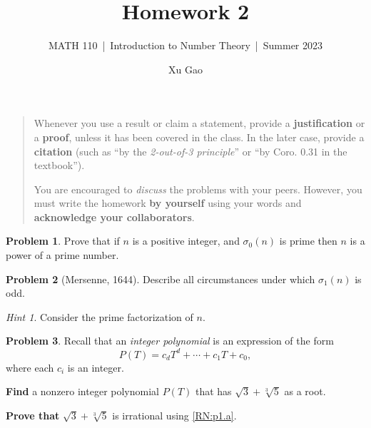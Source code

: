 \documentclass[11pt]{article}
\title{Homework 2}
\author{Xu Gao}
\subtitle{MATH 110~|~Introduction to Number Theory~|~Summer 2023}
\date{}
\theoremstyle{plain}
\theoremstyle{definition}
\newtheorem{problem}{Problem}
\theoremstyle{remark}
\newtheorem*{hint}{Hint}
\numberwithin{equation}{problem}
\begin{document}
\maketitle

\begin{quotation}
	Whenever you use a result or claim a statement, provide a \textbf{justification} or a \textbf{proof}, unless it has been covered in the class. In the later case, provide a \textbf{citation} (such as ``by the \emph{2-out-of-3 principle}'' or ``by Coro. 0.31 in the textbook'').

	You are encouraged to \emph{discuss} the problems with your peers. However, you must write the homework \textbf{by yourself} using your words and \textbf{acknowledge your collaborators}.
\end{quotation}
\vspace*{1em}


\begin{problem}
	Prove that if $n$ is a positive integer, and $\sigma_0(n)$ is prime then $n$ is a power of a prime number.
\end{problem}

\begin{problem}[Mersenne, 1644]
	Describe all circumstances under which $\sigma_1(n)$ is odd.
	\begin{hint}
		Consider the prime factorization of $n$.
	\end{hint}
\end{problem}



\begin{problem}
	Recall that an \emph{integer polynomial} is an expression of the form 
	\[P(T)=c_dT^d+\cdots+c_1T+c_0,\] 
	where each $c_i$ is an integer. 
	\begin{listinprob}
		\item\label{RN:p1.a} \textbf{Find} a nonzero integer polynomial $P(T)$ that has $\sqrt{3}+\sqrt[3]{5}$ as a root.
	\end{listinprob}
	\begin{listinprob}[resume]
		\item \textbf{Prove that} $\sqrt{3}+\sqrt[3]{5}$ is irrational using \ref{RN:p1.a}.
	\end{listinprob}
\end{problem}
\end{document}
